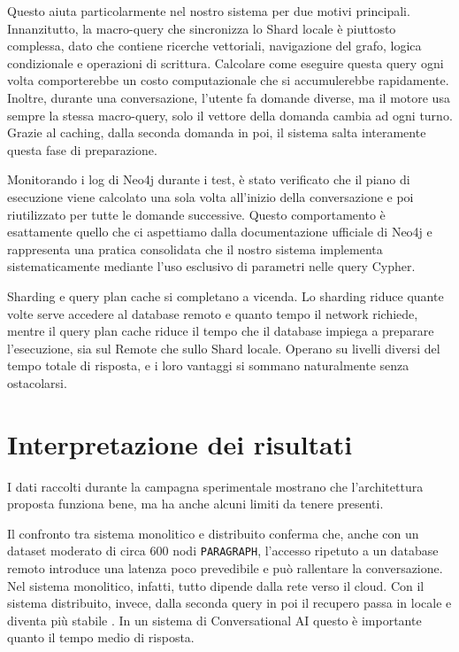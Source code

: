 Questo aiuta particolarmente nel nostro sistema per due motivi principali. Innanzitutto, la macro-query che sincronizza lo Shard locale è piuttosto complessa, dato che contiene ricerche vettoriali, navigazione del grafo, logica condizionale e operazioni di scrittura. Calcolare come eseguire questa query ogni volta comporterebbe un costo computazionale che si accumulerebbe rapidamente. Inoltre, durante una conversazione, l'utente fa domande diverse, ma il motore usa sempre la stessa macro-query, solo il vettore della domanda cambia ad ogni turno. Grazie al caching, dalla seconda domanda in poi, il sistema salta interamente questa fase di preparazione.

Monitorando i log di Neo4j durante i test, è stato verificato che il piano di esecuzione viene calcolato una sola volta all'inizio della conversazione e poi riutilizzato per tutte le domande successive. Questo comportamento è esattamente quello che ci aspettiamo dalla documentazione ufficiale di Neo4j \cite{neo4j_benchmarking} e rappresenta una pratica consolidata che il nostro sistema implementa sistematicamente mediante l'uso esclusivo di parametri nelle query Cypher.

Sharding e query plan cache si completano a vicenda. Lo sharding riduce quante volte serve accedere al database remoto e quanto tempo il network richiede, mentre il query plan cache riduce il tempo che il database impiega a preparare l'esecuzione, sia sul Remote che sullo Shard locale. Operano su livelli diversi del tempo totale di risposta, e i loro vantaggi si sommano naturalmente senza ostacolarsi.

\newpage

\section{Interpretazione dei risultati}

I dati raccolti durante la campagna sperimentale mostrano che l'architettura proposta funziona bene, ma ha anche alcuni limiti da tenere presenti.

Il confronto tra sistema monolitico e distribuito conferma che, anche con un dataset moderato di circa 600 nodi \texttt{PARAGRAPH}, l'accesso ripetuto a un database remoto introduce una latenza poco prevedibile e può rallentare la conversazione. Nel sistema monolitico, infatti, tutto dipende dalla rete verso il cloud. Con il sistema distribuito, invece, dalla seconda query in poi il recupero passa in locale e diventa più stabile \cite{kleppmann2017}. In un sistema di Conversational AI questo è importante quanto il tempo medio di risposta.

